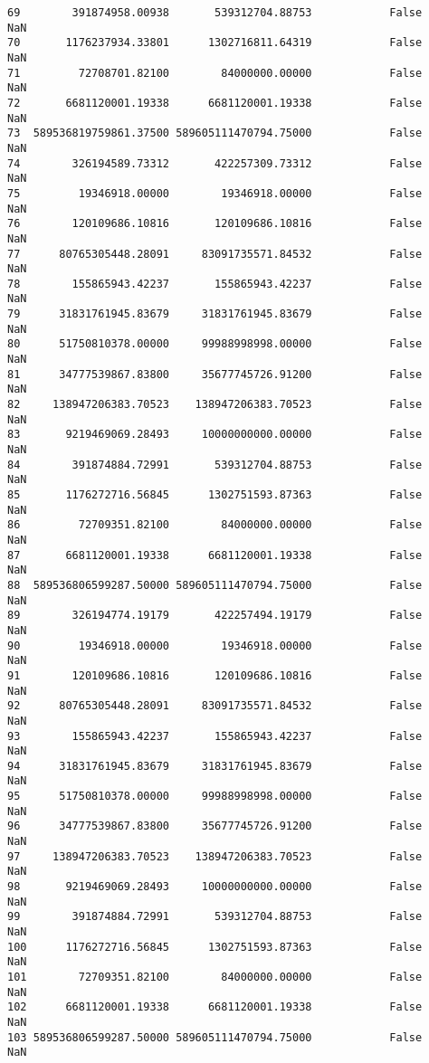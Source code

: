 \documentclass[11pt]{article}
\begin{document}
\begin{tcolorbox}[breakable, size=fbox, boxrule=.5pt, pad at break*=1mm, opacityfill=0]
\begin{Verbatim}[commandchars=\\\{\}]
69        391874958.00938       539312704.88753            False       NaN
70       1176237934.33801      1302716811.64319            False       NaN
71         72708701.82100        84000000.00000            False       NaN
72       6681120001.19338      6681120001.19338            False       NaN
73  589536819759861.37500 589605111470794.75000            False       NaN
74        326194589.73312       422257309.73312            False       NaN
75         19346918.00000        19346918.00000            False       NaN
76        120109686.10816       120109686.10816            False       NaN
77      80765305448.28091     83091735571.84532            False       NaN
78        155865943.42237       155865943.42237            False       NaN
79      31831761945.83679     31831761945.83679            False       NaN
80      51750810378.00000     99988998998.00000            False       NaN
81      34777539867.83800     35677745726.91200            False       NaN
82     138947206383.70523    138947206383.70523            False       NaN
83       9219469069.28493     10000000000.00000            False       NaN
84        391874884.72991       539312704.88753            False       NaN
85       1176272716.56845      1302751593.87363            False       NaN
86         72709351.82100        84000000.00000            False       NaN
87       6681120001.19338      6681120001.19338            False       NaN
88  589536806599287.50000 589605111470794.75000            False       NaN
89        326194774.19179       422257494.19179            False       NaN
90         19346918.00000        19346918.00000            False       NaN
91        120109686.10816       120109686.10816            False       NaN
92      80765305448.28091     83091735571.84532            False       NaN
93        155865943.42237       155865943.42237            False       NaN
94      31831761945.83679     31831761945.83679            False       NaN
95      51750810378.00000     99988998998.00000            False       NaN
96      34777539867.83800     35677745726.91200            False       NaN
97     138947206383.70523    138947206383.70523            False       NaN
98       9219469069.28493     10000000000.00000            False       NaN
99        391874884.72991       539312704.88753            False       NaN
100      1176272716.56845      1302751593.87363            False       NaN
101        72709351.82100        84000000.00000            False       NaN
102      6681120001.19338      6681120001.19338            False       NaN
103 589536806599287.50000 589605111470794.75000            False       NaN

\end{Verbatim}
\end{tcolorbox}
\end{document}
